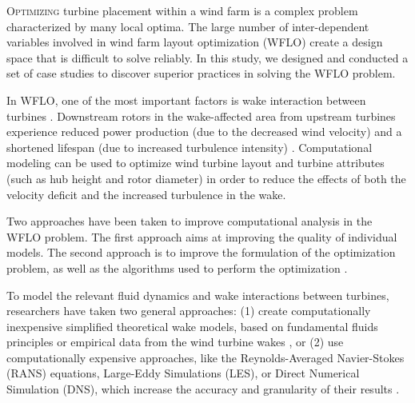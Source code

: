 

\lettrine[nindent=0pt]{O}{ptimizing} turbine placement within a wind farm is a complex problem characterized by many local optima.
The large number of inter-dependent variables involved in wind farm layout optimization (WFLO) create a design space that is difficult to solve reliably.
In this study, we designed and conducted a set of case studies to discover superior practices in solving the WFLO problem.

In WFLO, one of the most important factors is wake interaction between turbines \cite{HerbertAcero2014}.
Downstream rotors in the wake-affected area from upstream turbines experience reduced power production (due to the decreased wind velocity) and a shortened lifespan (due to increased turbulence intensity) \cite{Sanderse2009}.
Computational modeling can be used to optimize wind turbine layout and turbine attributes (such as hub height and rotor diameter) in order to reduce the effects of both the velocity deficit and the increased turbulence in the wake.

Two approaches have been taken to improve computational analysis in the WFLO problem.
The first approach aims at improving the quality of individual models.
The second approach is to improve the formulation of the optimization problem, as well as the algorithms used to perform the optimization \cite{Padron2018}.

To model the relevant fluid dynamics and wake interactions between turbines, researchers have taken two general approaches: (1) create  computationally inexpensive simplified theoretical wake models, based on fundamental fluids principles or empirical data from the wind turbine wakes \cite{Sanderse2009, Larsen2009, Vermeer2003}, or (2) use computationally expensive approaches, like the Reynolds-Averaged Navier-Stokes (RANS) equations, Large-Eddy Simulations (LES), or Direct Numerical Simulation (DNS), which increase the accuracy and granularity of their results \cite{Soren2011}.

